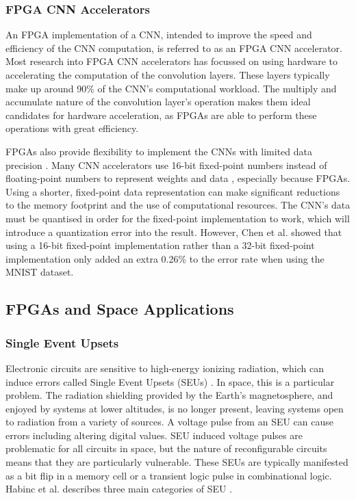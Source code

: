 \documentclass[12pt]{article}
\begin{document}
\subsubsection{FPGA CNN Accelerators}
\label{sec:Background-FpgaCnnImpl-Accel}


An FPGA implementation of a CNN, intended to improve the speed and efficiency of the CNN computation, is referred to as an FPGA CNN accelerator. Most research into FPGA CNN accelerators has focussed on using hardware to accelerating the computation of the convolution layers. These layers typically make up around 90\% of the CNN's computational workload. The multiply and accumulate nature of the convolution layer's operation makes them ideal candidates for hardware acceleration, as FPGAs are able to perform these operations with great efficiency. 

FPGAs also provide flexibility to implement the CNNs with limited data precision \cite{SudaFpgaAccelerator}. Many CNN accelerators use 16-bit fixed-point numbers instead of floating-point numbers to represent weights and data \cite{ZhangFpgaAccelerator}\cite{ChenFpgaAccelerator}\cite{FarabetFpgaAccelerator}, especially because FPGAs. Using a shorter, fixed-point data representation can make significant reductions to the memory footprint and the use of computational resources. The CNN's data must be quantised in order for the fixed-point implementation to work, which will introduce a quantization error into the result. However, Chen et al. showed that using a 16-bit fixed-point implementation rather than a 32-bit fixed-point implementation only added an extra 0.26\% to the error rate when using the MNIST dataset.

\subsection{FPGAs and Space Applications}
\label{sec:Background-FPGAsAndSpaceApplications}


\subsubsection{Single Event Upsets}
\label{sec:Background-FPGAsAndSpaceApplications-SEUs}


Electronic circuits are sensitive to high-energy ionizing radiation, which can induce errors called Single Event Upsets (SEUs) \cite{SeuTutorial}. In space, this is a particular problem. The radiation shielding provided by the Earth's magnetosphere, and enjoyed by systems at lower altitudes, is no longer present, leaving systems open to radiation from a  variety of sources. A voltage pulse from an SEU can cause errors including altering digital values. SEU induced voltage pulses are problematic for all circuits in space, but the nature of reconfigurable circuits means that they are particularly vulnerable. These SEUs are typically manifested as a bit flip in a memory cell or a transient logic pulse in combinational logic. Habinc et al. describes three main categories of SEU \cite{SuitabilityGaisler}.
\end{document}
